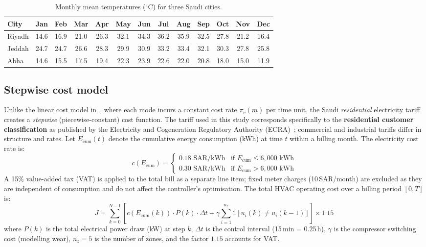 \documentclass[12pt]{article}
\theoremstyle{plain}
\theoremstyle{definition}
\begin{document}
\begin{table}[H]
\centering
\caption{Monthly mean temperatures ($^\circ$C) for three Saudi cities.}\label{tab:climate}

\begin{tabular*}{\textwidth}{@{\extracolsep{\fill}}lcccccccccccc}
\toprule
City & Jan & Feb & Mar & Apr & May & Jun & Jul & Aug & Sep & Oct & Nov & Dec \\
\midrule
Riyadh & 14.6 & 16.9 & 21.0 & 26.3 & 32.1 & 34.3 & 36.2 & 35.9 & 32.5 & 27.8 & 21.2 & 16.4 \\
Jeddah & 24.7 & 24.7 & 26.6 & 28.3 & 29.9 & 30.9 & 33.2 & 33.4 & 32.1 & 30.3 & 27.8 & 25.8 \\
Abha   & 14.6 & 15.5 & 17.5 & 19.4 & 22.3 & 23.9 & 22.6 & 22.0 & 20.8 & 18.0 & 15.0 & 11.9 \\
\bottomrule
\end{tabular*}
\end{table}

\subsection{Stepwise cost model}\label{sec:cost}

Unlike the linear cost model in~\cite{mousa2018optimal}, where each mode incurs a constant cost rate $\pi_c(m)$ per time unit, the Saudi \emph{residential} electricity tariff creates a \emph{stepwise} (piecewise-constant) cost function. The tariff used in this study corresponds specifically to the \textbf{residential customer classification} as published by the Electricity and Cogeneration Regulatory Authority (ECRA)~\cite{ecra2025}; commercial and industrial tariffs differ in structure and rates. Let $E_{\text{cum}}(t)$ denote the cumulative energy consumption (kWh) at time $t$ within a billing month. The electricity cost rate is:
\begin{equation}\label{eq:tariff}
c(E_{\text{cum}}) = \begin{cases}
0.18 \text{ SAR/kWh} & \text{if } E_{\text{cum}} \leq 6{,}000 \text{ kWh} \\
0.30 \text{ SAR/kWh} & \text{if } E_{\text{cum}} > 6{,}000 \text{ kWh}
\end{cases}
\end{equation}
A 15\% value-added tax (VAT) is applied to the total bill as a separate line item; fixed meter charges (10\,SAR/month) are excluded as they are independent of consumption and do not affect the controller's optimisation. The total HVAC operating cost over a billing period $[0, T]$ is:
\begin{equation}\label{eq:total_cost}
J = \sum_{k=0}^{N-1} \left[ c\!\left(E_{\text{cum}}(k)\right) \cdot P(k) \cdot \Delta t + \gamma \sum_{i=1}^{n_z} \mathbb{1}[u_i(k) \neq u_i(k\!-\!1)] \right] \times 1.15
\end{equation}
where $P(k)$ is the total electrical power draw (kW) at step $k$, $\Delta t$ is the control interval (15\,min = 0.25\,h), $\gamma$ is the compressor switching cost (modelling wear), $n_z = 5$ is the number of zones, and the factor $1.15$ accounts for VAT.
\end{document}

